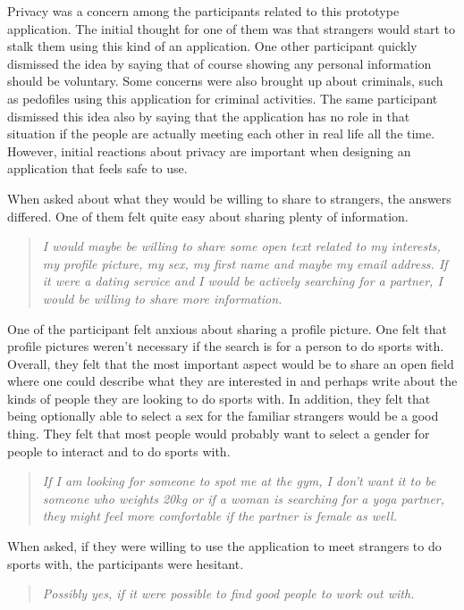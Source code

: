 Privacy was a concern among the participants related to this prototype application. The initial thought for one of them was that strangers would start to stalk them using this kind of an application. One other participant quickly dismissed the idea by saying that of course showing any personal information should be voluntary. Some concerns were also brought up about criminals, such as pedofiles using this application for criminal activities. The same participant dismissed this idea also by saying that the application has no role in that situation if the people are actually meeting each other in real life all the time. However, initial reactions about privacy are important when designing an application that feels safe to use.

When asked about what they would be willing to share to strangers, the answers differed. One of them felt quite easy about sharing plenty of information.

\begin{quotation}
\it I would maybe be willing to share some open text related to my interests, my profile picture, my sex, my first name and maybe my email address. If it were a dating service and I would be actively searching for a partner, I would be willing to share more information.
\end{quotation}

One of the participant felt anxious about sharing a profile picture. One felt that profile pictures weren't necessary if the search is for a person to do sports with. Overall, they felt that the most important aspect would be to share an open field where one could describe what they are interested in and perhaps write about the kinds of people they are looking to do sports with. In addition, they felt that being optionally able to select a sex for the familiar strangers would be a good thing. They felt that most people would probably want to select a gender for people to interact and to do sports with.

\begin{quotation}
\it If I am looking for someone to spot me at the gym, I don't want it to be someone who weights 20kg or if a woman is searching for a yoga partner, they might feel more comfortable if the partner is female as well.
\end{quotation}

When asked, if they were willing to use the application to meet strangers to do sports with, the participants were hesitant.

\begin{quotation}
\it Possibly yes, if it were possible to find good people to work out with.
\end{quotation}

